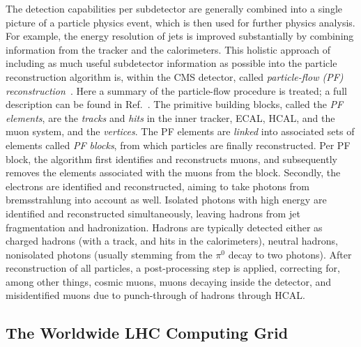 The detection capabilities per subdetector
are generally combined into a single picture of a particle physics event, which is then used for further physics analysis.
% 
% 
For example, the energy resolution of jets is improved substantially by combining information from the tracker and the calorimeters.
% 
This holistic approach of including as much useful subdetector information as possible into the particle reconstruction algorithm is, within the CMS detector, called \textit{particle-flow (PF) reconstruction}~\cite{Sirunyan:2017ulk}.
% 
Here a summary of the particle-flow procedure is treated; a full description can be found in Ref.~\cite{Sirunyan:2017ulk}.
% 
The primitive building blocks, called the \textit{PF elements}, are the \textit{tracks} and \textit{hits} in the inner tracker, ECAL, HCAL, and the muon system, and the \textit{vertices}.
% 
The PF elements are \textit{linked} into associated sets of elements called \textit{PF blocks}, from which particles are finally reconstructed.
% 
Per PF block, the algorithm first identifies and reconstructs muons, and subsequently removes the elements associated with the muons from the block.
% 
Secondly, the electrons are identified and reconstructed, aiming to take photons from bremsstrahlung into account as well.
% 
Isolated photons with high energy are identified and reconstructed simultaneously, leaving hadrons from jet fragmentation and hadronization.
% 
Hadrons are typically detected either as charged hadrons (with a track, and hits in the calorimeters), neutral hadrons, nonisolated photons (usually stemming from the $\pi^0$ decay to two photons).
% 
After reconstruction of all particles, a post-processing step is applied, correcting for, among other things, cosmic muons, muons decaying inside the detector, and misidentified muons due to punch-through of hadrons through HCAL.


\subsection{The Worldwide LHC Computing Grid}

